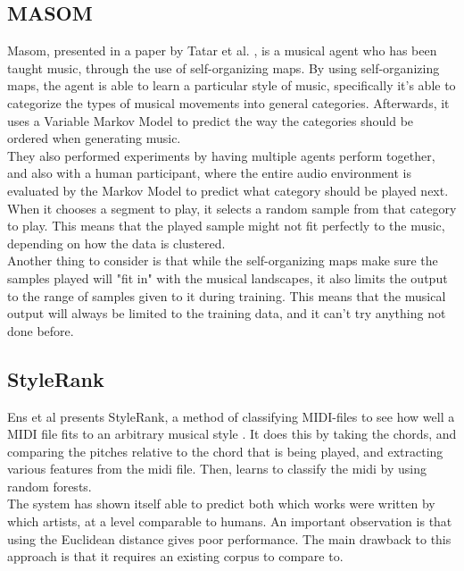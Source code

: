 \documentclass[a4paper,english]{report}
\begin{document}
	\subsection{MASOM}
	Masom, presented in a paper by Tatar et al. \cite{tatar2017masom}, is a musical agent who has been taught music, through the use of self-organizing maps. By using self-organizing maps, the agent is able to learn a particular style of music, specifically it's able to categorize the types of musical movements into general categories. Afterwards, it uses a Variable Markov Model to predict the way the categories should be ordered when generating music.\\
	They also performed experiments by having multiple agents perform together, and also with a human participant, where the entire audio environment is evaluated by the Markov Model to predict what category should be played next. When it chooses a segment to play, it selects a random sample from that category to play. This means that the played sample might not fit perfectly to the music, depending on how the data is clustered.\\
	Another thing to consider is that while the self-organizing maps make sure the samples played will "fit in" with the musical landscapes, it also limits the output to the range of samples given to it during training. This means that the musical output will always be limited to the training data, and it can't try anything not done before.
	
	\subsection{StyleRank}
	Ens et al presents StyleRank, a method of classifying MIDI-files to see how well a MIDI file fits to an arbitrary musical style \cite{ens2020quantifying}. It does this by taking the chords, and comparing the pitches relative to the chord that is being played, and extracting various features from the midi file. Then, learns to classify the midi by using random forests.\\
	The system has shown itself able to predict both which works were written by which artists, at a level comparable to humans. An important observation is that using the Euclidean distance gives poor performance. The main drawback to this approach is that it requires an existing corpus to compare to.
	
\end{document}
